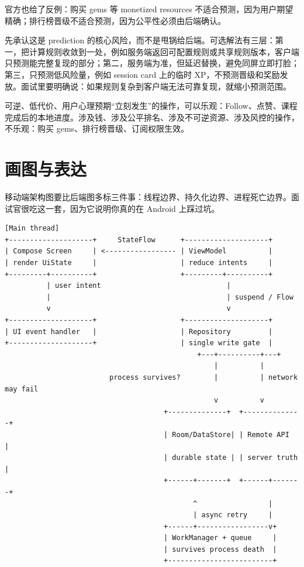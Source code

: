 \srcofficial 官方也给了反例：购买 gems 等 monetized resources 不适合预测，因为用户期望精确；排行榜晋级不适合预测，因为公平性必须由后端确认。

\begin{followup}
先承认这是 prediction 的核心风险，而不是甩锅给后端。可选解法有三层：第一，把计算规则收敛到一处，例如服务端返回可配置规则或共享规则版本，客户端只预测能完整复现的部分；第二，服务端为准，但延迟替换，避免同屏立即打脸；第三，只预测低风险量，例如 session card 上的临时 XP，不预测晋级和奖励发放。面试里要明确说：如果规则复杂到客户端无法可靠复现，就缩小预测范围。
\end{followup}

\begin{keypoint}[乐观更新决策规则]
可逆、低代价、用户心理预期“立刻发生”的操作，可以乐观：Follow、点赞、课程完成后的本地进度。涉及钱、涉及公平排名、涉及不可逆资源、涉及风控的操作，不乐观：购买 gems、排行榜晋级、订阅权限生效。
\end{keypoint}

\section{画图与表达}

移动端架构图要比后端图多标三件事：线程边界、持久化边界、进程死亡边界。面试官很吃这一套，因为它说明你真的在 Android 上踩过坑。

\begin{lstlisting}
[Main thread]
+--------------------+     StateFlow      +--------------------+
| Compose Screen     | <----------------- | ViewModel          |
| render UiState     |                    | reduce intents     |
+---------+----------+                    +---------+----------+
          | user intent                              |
          |                                          | suspend / Flow
          v                                          v
+--------------------+                    +--------------------+
| UI event handler   |                    | Repository         |
+--------------------+                    | single write gate  |
                                              +---+----------+---+
                                                  |          |
                         process survives?        |          | network may fail
                                                  v          v
                                      +--------------+  +--------------+
                                      | Room/DataStore| | Remote API   |
                                      | durable state | | server truth |
                                      +------+-------+  +------+-------+
                                             ^                 |
                                             | async retry     |
                                      +------+-----------------v+
                                      | WorkManager + queue     |
                                      | survives process death  |
                                      +-------------------------+
\end{lstlisting}

